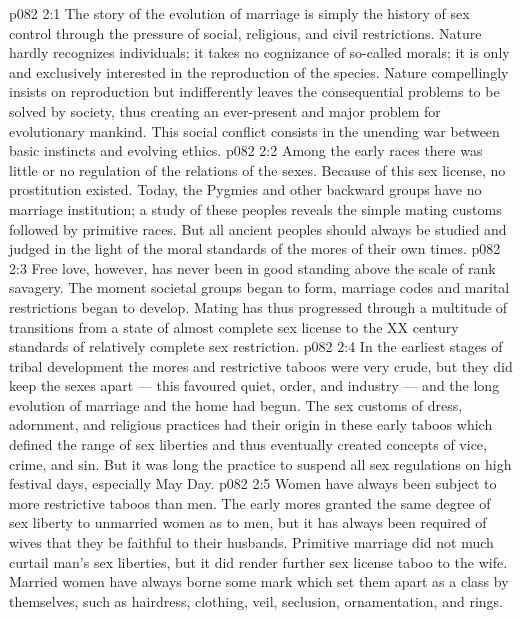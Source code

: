 \vs p082 2:1 The story of the evolution of marriage is simply the history of sex control through the pressure of social, religious, and civil restrictions. Nature hardly recognizes individuals; it takes no cognizance of so\hyp{}called morals; it is only and exclusively interested in the reproduction of the species. Nature compellingly insists on reproduction but indifferently leaves the consequential problems to be solved by society, thus creating an ever\hyp{}present and major problem for evolutionary mankind. This social conflict consists in the unending war between basic instincts and evolving ethics.
\vs p082 2:2 \pc Among the early races there was little or no regulation of the relations of the sexes. Because of this sex license, no prostitution existed. Today, the Pygmies and other backward groups have no marriage institution; a study of these peoples reveals the simple mating customs followed by primitive races. But all ancient peoples should always be studied and judged in the light of the moral standards of the mores of their own times.
\vs p082 2:3 Free love, however, has never been in good standing above the scale of rank savagery. The moment societal groups began to form, marriage codes and marital restrictions began to develop. Mating has thus progressed through a multitude of transitions from a state of almost complete sex license to the XX century standards of relatively complete sex restriction.
\vs p082 2:4 In the earliest stages of tribal development the mores and restrictive taboos were very crude, but they did keep the sexes apart --- this favoured quiet, order, and industry --- and the long evolution of marriage and the home had begun. The sex customs of dress, adornment, and religious practices had their origin in these early taboos which defined the range of sex liberties and thus eventually created concepts of vice, crime, and sin. But it was long the practice to suspend all sex regulations on high festival days, especially May Day.
\vs p082 2:5 \pc Women have always been subject to more restrictive taboos than men. The early mores granted the same degree of sex liberty to unmarried women as to men, but it has always been required of wives that they be faithful to their husbands. Primitive marriage did not much curtail man’s sex liberties, but it did render further sex license taboo to the wife. Married women have always borne some mark which set them apart as a class by themselves, such as hairdress, clothing, veil, seclusion, ornamentation, and rings.
